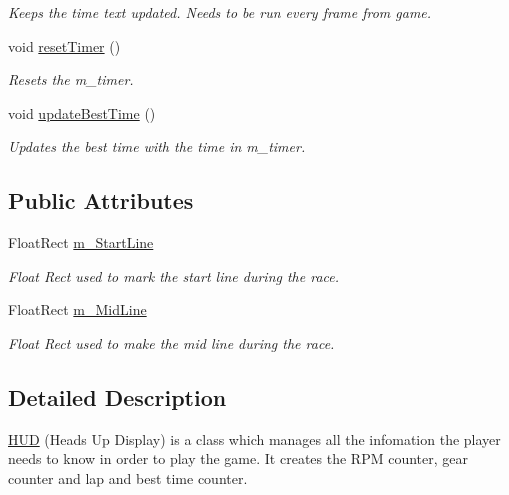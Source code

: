 \begin{DoxyCompactItemize}
\begin{DoxyCompactList}\small\item\em Keeps the time text updated. Needs to be run every frame from game. \end{DoxyCompactList}\item 
void \hyperlink{class_h_u_d_a489a9c8cb61422fa5f3256346e3fb3a9}{reset\+Timer} ()
\begin{DoxyCompactList}\small\item\em Resets the m\+\_\+timer. \end{DoxyCompactList}\item 
void \hyperlink{class_h_u_d_aff3c87dbcce63e0fb4136c18149f3a65}{update\+Best\+Time} ()
\begin{DoxyCompactList}\small\item\em Updates the best time with the time in m\+\_\+timer. \end{DoxyCompactList}\end{DoxyCompactItemize}
\subsection*{Public Attributes}
\begin{DoxyCompactItemize}
\item 
\hypertarget{class_h_u_d_a22d7ec3ed9526c49701e2fbe57c3a509}{}Float\+Rect \hyperlink{class_h_u_d_a22d7ec3ed9526c49701e2fbe57c3a509}{m\+\_\+\+Start\+Line}\label{class_h_u_d_a22d7ec3ed9526c49701e2fbe57c3a509}

\begin{DoxyCompactList}\small\item\em Float Rect used to mark the start line during the race. \end{DoxyCompactList}\item 
\hypertarget{class_h_u_d_a00ad3821cf2d266c31c5eb095ded60f1}{}Float\+Rect \hyperlink{class_h_u_d_a00ad3821cf2d266c31c5eb095ded60f1}{m\+\_\+\+Mid\+Line}\label{class_h_u_d_a00ad3821cf2d266c31c5eb095ded60f1}

\begin{DoxyCompactList}\small\item\em Float Rect used to make the mid line during the race. \end{DoxyCompactList}\end{DoxyCompactItemize}


\subsection{Detailed Description}
\hyperlink{class_h_u_d}{H\+U\+D} (Heads Up Display) is a class which manages all the infomation the player needs to know in order to play the game. It creates the R\+P\+M counter, gear counter and lap and best time counter.

